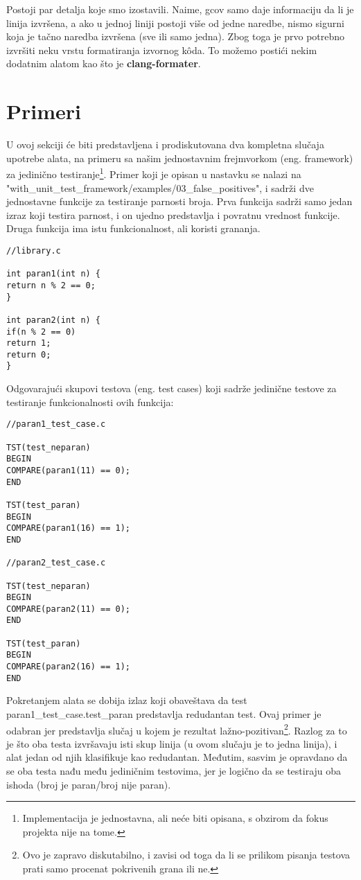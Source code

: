 \documentclass[a4paper]{article}
\begin{document}
Postoji par detalja koje smo izostavili. Naime, gcov samo daje informaciju da li je linija izvršena, a ako u jednoj liniji postoji više od jedne naredbe, nismo sigurni koja je tačno naredba izvršena (sve ili samo jedna). Zbog toga je prvo potrebno izvršiti neku vrstu formatiranja izvornog kôda. To možemo postići nekim dodatnim alatom kao što je \textbf{clang-formater}.


\section{Primeri}
\label{sec:examples}
U ovoj sekciji će biti predstavljena i prodiskutovana dva kompletna slučaja upotrebe alata, na primeru sa našim jednostavnim frejmvorkom (eng. framework) za jedinično testiranje\footnote{Implementacija je jednostavna, ali neće biti opisana, s obzirom da fokus projekta nije na tome.}. Primer koji je opisan u nastavku se nalazi na "with\_unit\_test\_framework/examples/03\_false\_positives", i sadrži dve jednostavne funkcije za testiranje parnosti broja. Prva funkcija sadrži samo jedan izraz koji testira parnost, i on ujedno predstavlja i povratnu vrednost funkcije. Druga funkcija ima istu funkcionalnost, ali koristi grananja.

\begin{lstlisting}
//library.c

int paran1(int n) {
return n % 2 == 0;
}

int paran2(int n) {
if(n % 2 == 0)
return 1;
return 0;
}
\end{lstlisting}

Odgovarajući skupovi testova (eng. test cases) koji sadrže jedinične testove za testiranje funkcionalnosti ovih funkcija:

\begin{lstlisting}
//paran1_test_case.c

TST(test_neparan)
BEGIN
COMPARE(paran1(11) == 0);
END

TST(test_paran)
BEGIN
COMPARE(paran1(16) == 1);
END

//paran2_test_case.c

TST(test_neparan)
BEGIN
COMPARE(paran2(11) == 0);
END

TST(test_paran)
BEGIN
COMPARE(paran2(16) == 1);
END

\end{lstlisting}

Pokretanjem alata se dobija izlaz koji obaveštava da test paran1\_test\_case.test\_paran predstavlja redudantan test. Ovaj primer je odabran jer predstavlja slučaj u kojem je rezultat lažno-pozitivan\footnote{Ovo je zapravo diskutabilno, i zavisi od toga da li se prilikom pisanja testova prati samo procenat pokrivenih grana ili ne.}. Razlog za to je što oba testa izvršavaju isti skup linija (u ovom slučaju je to jedna linija), i alat jedan od njih klasifikuje kao redudantan. Međutim, sasvim je opravdano da se oba testa nađu među jediničnim testovima, jer je logično da se testiraju oba ishoda (broj je paran/broj nije paran).
\end{document}
